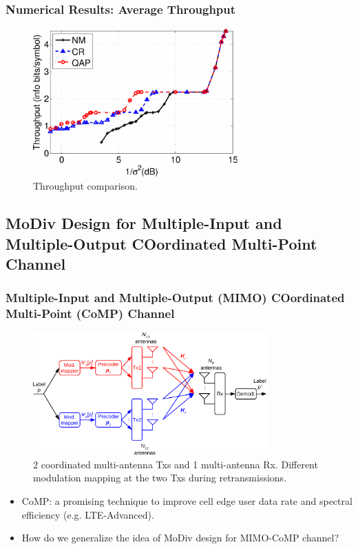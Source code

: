 \documentclass{beamer}
\begin{document}
\begin{frame}
  \frametitle{Numerical Results: Average Throughput}
  \begin{figure}
    \includegraphics[width=0.7\textwidth]{figs/throughput_6M_64QAM.pdf}
    \caption{Throughput comparison.}
  \end{figure}
\end{frame}

\subsection[MoDiv for MIMO-HARQ]{MoDiv Design for Multiple-Input and
Multiple-Output COordinated Multi-Point Channel}
\begin{frame}
  \frametitle{Multiple-Input and Multiple-Output (MIMO) COordinated Multi-Point
  (CoMP) Channel}
  \begin{figure}
    \includegraphics[width=0.8\textwidth]{figs/mimo.pdf}
    \caption{2 coordinated multi-antenna Txs and 1 multi-antenna
    Rx. Different modulation mapping at the two Txs during
    retransmissions.}
  \end{figure}
  \vspace{-10pt}
  \begin{itemize}
    \item CoMP:  a promising technique to improve cell edge user data rate and
    spectral efficiency (e.g. LTE-Advanced).
    \item How do we generalize the idea of MoDiv design for MIMO-CoMP channel?
  \end{itemize}
\end{frame}
\end{document}
